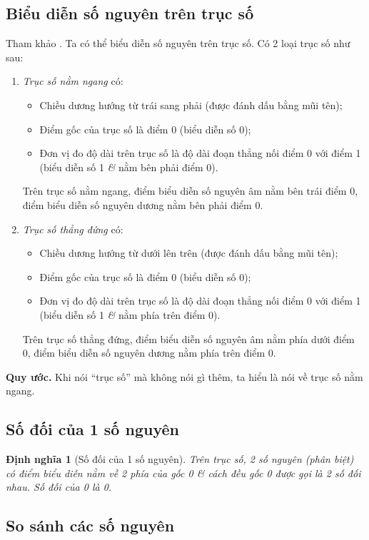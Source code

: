 \documentclass[oneside]{book}
\numberwithin{equation}{section}
\newtheorem{dinhnghia}{Định nghĩa}[section]
\begin{document}
\subsection{Biểu diễn số nguyên trên trục số}
Tham khảo \cite[pp. 65--66]{Thai_Anh_Dat_Ha_Loan_Nam_Quang_Toan_6_tap_1}. Ta có thể biểu diễn số nguyên trên trục số. Có 2 loại trục số như sau:
\begin{enumerate}
	\item \textit{Trục số nằm ngang} có:
	\begin{itemize}
		\item Chiều dương hướng từ trái sang phải (được đánh dấu bằng mũi tên);
		\item Điểm gốc của trục số là điểm 0 (biểu diễn số 0);
		\item Đơn vị đo độ dài trên trục số là độ dài đoạn thẳng nối điểm 0 với điểm 1 (biểu diễn số 1 \textit{\&} nằm bên phải điểm 0).
	\end{itemize}
	Trên trục số nằm ngang, điểm biểu diễn số nguyên âm nằm bên trái điểm 0, điểm biểu diễn số nguyên dương nằm bên phải điểm 0.
	\item \textit{Trục số thẳng đứng} có:
	\begin{itemize}
		\item Chiều dương hướng từ dưới lên trên (được đánh dấu bằng mũi tên);
		\item Điểm gốc của trục số là điểm 0 (biểu diễn số 0);
		\item Đơn vị đo độ dài trên trục số là độ dài đoạn thẳng nối điểm 0 với điểm 1 (biểu diễn số 1 \textit{\&} nằm phía trên điểm 0).
	\end{itemize}
	Trên trục số thẳng đứng, điểm biểu diễn số nguyên âm nằm phía dưới điểm 0, điểm biểu diễn số nguyên dương nằm phía trên điểm 0.
\end{enumerate}
\noindent\textbf{Quy ước.} Khi nói ``trục số'' mà không nói gì thêm, ta hiểu là nói về trục số nằm ngang.

\subsection{Số đối của 1 số nguyên}

\begin{dinhnghia}[Số đối của 1 số nguyên]
	Trên trục số, 2 số nguyên (phân biệt) có điểm biểu diễn nằm về 2 phía của gốc 0 \textit{\&} cách đều gốc 0 được gọi là \emph{2 số đối nhau}. Số đối của 0 là 0.
\end{dinhnghia}

\subsection{So sánh các số nguyên}
\end{document}
